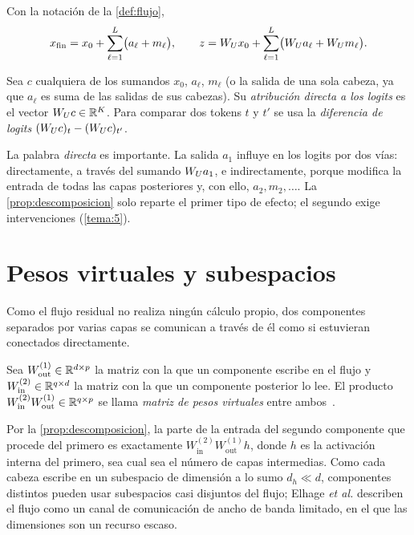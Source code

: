 \begin{proposicion}\label{prop:descomposicion}
Con la notación de la \cref{def:flujo},
\[
x_{\mathrm{fin}}=x_0+\sum_{\ell=1}^{L}\bigl(a_\ell+m_\ell\bigr),\qquad
z=W_{U} x_0+\sum_{\ell=1}^{L}\bigl(W_{U} a_\ell+W_{U} m_\ell\bigr).
\]
\end{proposicion}

\begin{definicion}\label{def:dla}
Sea $c$ cualquiera de los sumandos $x_0$, $a_\ell$, $m_\ell$ (o la salida de una sola cabeza, ya que $a_\ell$ es suma de las salidas de sus cabezas). Su \emph{atribución directa a los logits} es el vector $W_{U} c\in\mathbb{R}^{K}$. Para comparar dos tokens $t$ y $t'$ se usa la \emph{diferencia de logits} $(W_{U} c)_t-(W_{U} c)_{t'}$.
\end{definicion}

La palabra \emph{directa} es importante. La salida $a_1$ influye en los logits por dos vías: directamente, a través del sumando $W_{U} a_1$, e indirectamente, porque modifica la entrada de todas las capas posteriores y, con ello, $a_2,m_2,\dots$. La \cref{prop:descomposicion} solo reparte el primer tipo de efecto; el segundo exige intervenciones (\cref{tema:5}).

\addtocounter{figure}{1}%

\addtocounter{definicion}{1}%

\section{Pesos virtuales y subespacios}

Como el flujo residual no realiza ningún cálculo propio, dos componentes separados por varias capas se comunican a través de él como si estuvieran conectados directamente.

\begin{definicion}\label{def:virtuales}
Sea $W_{\mathrm{out}}^{(1)}\in\mathbb{R}^{d\times p}$ la matriz con la que un componente escribe en el flujo y $W_{\mathrm{in}}^{(2)}\in\mathbb{R}^{q\times d}$ la matriz con la que un componente posterior lo lee. El producto $W_{\mathrm{in}}^{(2)}W_{\mathrm{out}}^{(1)}\in\mathbb{R}^{q\times p}$ se llama \emph{matriz de pesos virtuales} entre ambos~\cite[«Virtual Weights and the Residual Stream as a Communication Channel»]{elhage21}.
\end{definicion}

Por la \cref{prop:descomposicion}, la parte de la entrada del segundo componente que procede del primero es exactamente $W_{\mathrm{in}}^{(2)}W_{\mathrm{out}}^{(1)}h$, donde $h$ es la activación interna del primero, sea cual sea el número de capas intermedias. Como cada cabeza escribe en un subespacio de dimensión a lo sumo $d_h\ll d$, componentes distintos pueden usar subespacios casi disjuntos del flujo; Elhage \emph{et al.} describen el flujo como un canal de comunicación de ancho de banda limitado, en el que las dimensiones son un recurso escaso.

